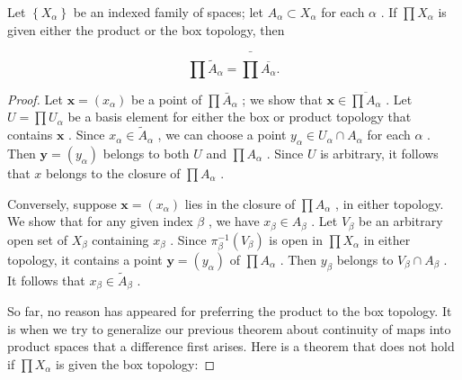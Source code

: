 \begin{theorem} Let \(\left\{  {X}_{\alpha }\right\}\) be an indexed family of spaces; let \({A}_{\alpha } \subset  {X}_{\alpha }\) for each \(\alpha\) . If \(\prod {X}_{\alpha }\) is given either the product or the box topology, then

\[
\prod {\widetilde{A}}_{\alpha } = \bar{\prod }\overline{{A}_{\alpha }}.
\]

\end{theorem}
\begin{proof}
Let \(\mathbf{x} = \left( {x}_{\alpha }\right)\) be a point of \(\prod {\bar{A}}_{\alpha }\) ; we show that \(\mathbf{x} \in  \overline{\prod {A}_{\alpha }}\) . Let \(U = \prod {U}_{\alpha }\) be a basis element for either the box or product topology that contains \(\mathbf{x}\) . Since \({x}_{\alpha } \in  {\widetilde{A}}_{\alpha }\) , we can choose a point \({y}_{\alpha } \in  {U}_{\alpha } \cap  {A}_{\alpha }\) for each \(\alpha\) . Then \(\mathbf{y} = \left( {y}_{\alpha }\right)\) belongs to both \(U\) and \(\prod {A}_{\alpha }\) . Since \(U\) is arbitrary, it follows that \(x\) belongs to the closure of \(\prod {A}_{\alpha }\) .

Conversely, suppose \(\mathbf{x} = \left( {x}_{\alpha }\right)\) lies in the closure of \(\prod {A}_{\alpha }\) , in either topology. We show that for any given index \(\beta\) , we have \({x}_{\beta } \in  {A}_{\beta }\) . Let \({V}_{\beta }\) be an arbitrary open set of \({X}_{\beta }\) containing \({x}_{\beta }\) . Since \({\pi }_{\beta }^{-1}\left( {V}_{\beta }\right)\) is open in \(\prod {X}_{\alpha }\) in either topology, it contains a point \(\mathbf{y} = \left( {y}_{\alpha }\right)\) of \(\prod {A}_{\alpha }\) . Then \({y}_{\beta }\) belongs to \({V}_{\beta } \cap  {A}_{\beta }\) . It follows that \({x}_{\beta } \in  {\widetilde{A}}_{\beta }\) .

So far, no reason has appeared for preferring the product to the box topology. It is when we try to generalize our previous theorem about continuity of maps into product spaces that a difference first arises. Here is a theorem that does not hold if \(\prod {X}_{\alpha }\) is given the box topology:
\end{proof}

